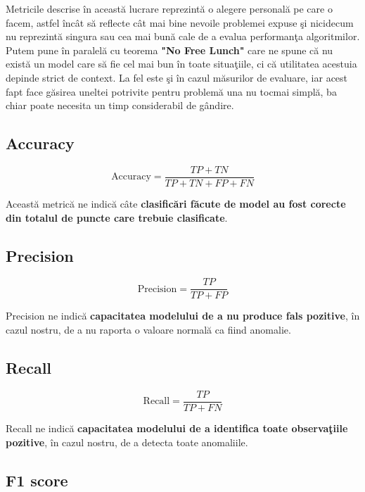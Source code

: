 Metricile descrise în această lucrare reprezintă o alegere personală pe care o facem, astfel
încât să reflecte cât mai bine nevoile problemei expuse şi nicidecum nu reprezintă singura
sau cea mai bună cale de a evalua performanţa algoritmilor. Putem pune în paralelă cu teorema
\textbf{"No Free Lunch"} care ne spune că nu există un model care să fie cel mai bun în toate situaţiile,
ci că utilitatea acestuia depinde strict de context. La fel este şi în cazul măsurilor de evaluare,
iar acest fapt face găsirea uneltei potrivite pentru problemă una nu tocmai simplă, ba chiar 
poate necesita un timp considerabil de gândire.

\subsection{Accuracy}

\begin{equation}
    \text{Accuracy} = \frac{TP + TN}{TP + TN + FP + FN}
\end{equation}

Această metrică ne indică câte 
\textbf{clasificări făcute de model au fost corecte din 
totalul de puncte care trebuie clasificate}.

\subsection{Precision}

\begin{equation}
    \text{Precision} = \frac{TP}{TP + FP}
\end{equation}

Precision ne indică \textbf{capacitatea modelului de a nu produce fals pozitive}, în cazul nostru,
de a nu raporta o valoare normală ca fiind anomalie.

\subsection{Recall}

\begin{equation}
    \text{Recall} = \frac{TP}{TP + FN}
\end{equation}

Recall ne indică 
\textbf{capacitatea modelului de a identifica toate observaţiile pozitive},
în cazul nostru, de a detecta toate anomaliile.

\subsection{F1 score}

